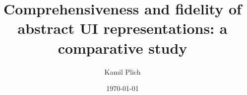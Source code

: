 \documentclass[11pt]{article}
\begin{document}
    \title{Comprehensiveness and fidelity of abstract UI representations: a comparative study}
    \author{Kamil Plich}
    \date{\today}
    \maketitle

    \begin{abstract}
        
    \end{abstract}

    
    

    
    
\end{document}
